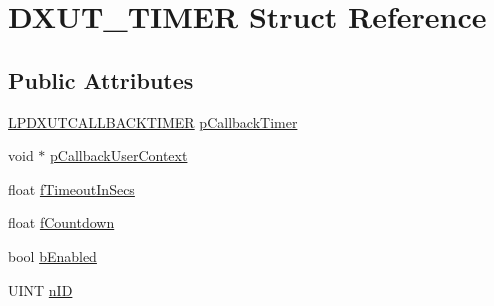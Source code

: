 \hypertarget{struct_d_x_u_t___t_i_m_e_r}{
\section{DXUT\_\-TIMER Struct Reference}
\label{struct_d_x_u_t___t_i_m_e_r}
}
\subsection*{Public Attributes}
\begin{DoxyCompactItemize}
\item 
\hyperlink{_d_x_u_t_8h_a8ce5df6fd1b9663490cc97c4f843df03}{LPDXUTCALLBACKTIMER} \hyperlink{struct_d_x_u_t___t_i_m_e_r_aebbdf57604305732406ad29ae90214f0}{pCallbackTimer}
\item 
void $\ast$ \hyperlink{struct_d_x_u_t___t_i_m_e_r_a5c7f0df10a281ce4edfc8fd74e7120bf}{pCallbackUserContext}
\item 
float \hyperlink{struct_d_x_u_t___t_i_m_e_r_aa40bd49701003a16a462639b5e491d3f}{fTimeoutInSecs}
\item 
float \hyperlink{struct_d_x_u_t___t_i_m_e_r_a792bef915749e62ee6cabd06f9e5c722}{fCountdown}
\item 
bool \hyperlink{struct_d_x_u_t___t_i_m_e_r_a751d6b0959c550a79993ac467416ab87}{bEnabled}
\item 
UINT \hyperlink{struct_d_x_u_t___t_i_m_e_r_a20ce9c19ffc97821df8b048541a01348}{nID}
\end{DoxyCompactItemize}



